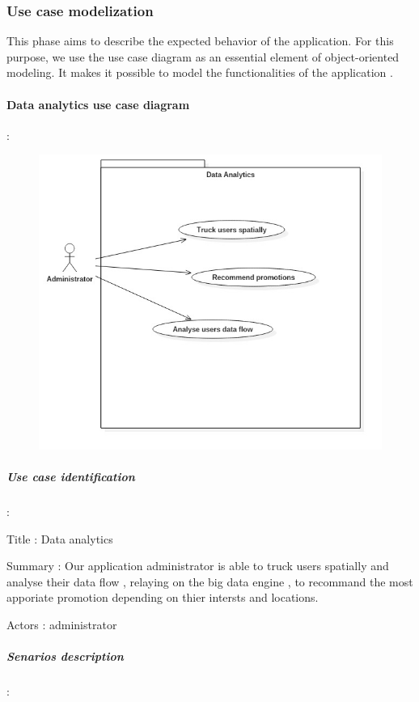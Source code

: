 \subsubsection{Use case modelization}
\label{sec:sec01}
This phase aims to describe the expected behavior of the application. 
For this purpose, we use the use case diagram as an essential element of object-oriented modeling. 
It makes it possible to model the functionalities of the application . 
\paragraph{Data analytics use case diagram} :
\label{sec:sec01}
\begin{figure}[H]
	\centering
	\includegraphics[height=0.4\textheight]{fig01/DataAnalyticsUseCasediagram}
	\label{fig:FilialesEtClients}
\end{figure}

\subparagraph{Use case identification} :
\label{sec:sec01} 

Title : Data analytics

Summary : Our application administrator is able to truck users spatially and analyse their data flow , relaying on
the big data engine , to recommand the most apporiate promotion depending on thier intersts and locations.

Actors : administrator

\subparagraph{Senarios description} :
\label{sec:sec01}

